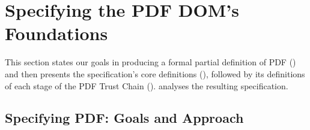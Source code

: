 \section{Specifying the PDF DOM's Foundations}
\label{sec:specifying}

This section %
states our goals in producing a formal partial definition of PDF
() and then presents the specification's core
definitions (), followed by its definitions of each
stage of the PDF Trust Chain ().
%
 analyses the resulting specification.

\subsection{Specifying PDF: Goals and Approach}
\label{sec:spec-goals}

